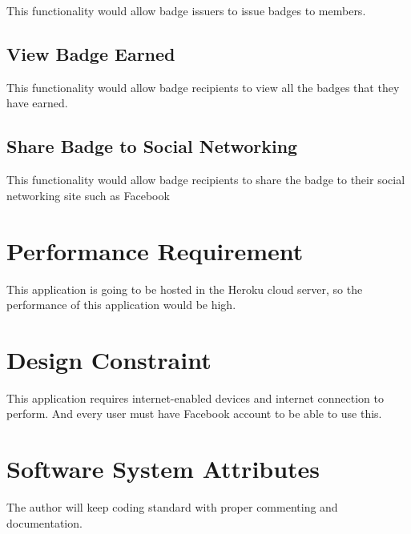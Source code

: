 This functionality would allow badge issuers to issue badges to members. 

\subsection{View Badge Earned}

This functionality would allow badge recipients to view all the badges that they have earned.

\subsection{Share Badge to Social Networking} 

This functionality would allow badge recipients to share the badge to their social networking site such as Facebook

\section{Performance Requirement}

This application is going to be hosted in the Heroku cloud server, so the performance of this application would be high.
 
\section{Design Constraint}

This application requires internet-enabled devices and internet connection to perform. And every user must have Facebook account to be able to use this. 

\section{Software System Attributes}

The author will keep coding standard with proper commenting and documentation.
